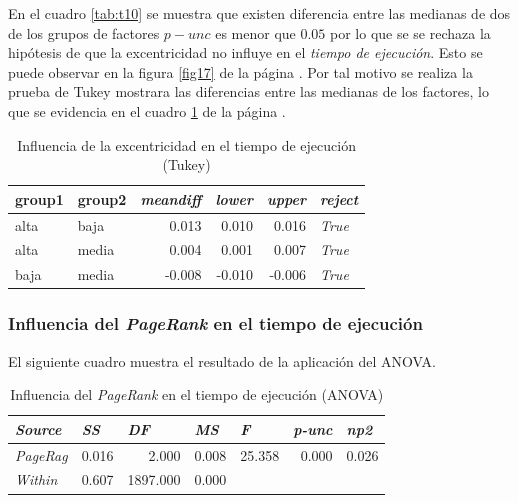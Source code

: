 \documentclass{article}
\begin{document}
En el cuadro \ref{tab:t10} se muestra que existen  diferencia entre las medianas de dos de los grupos de factores  \textbf{$p-unc$} es menor que $0.05$ por lo que se se rechaza la hipótesis de que la excentricidad no influye en el \textit{tiempo de ejecución}. Esto se puede observar en la figura \ref{fig17} de la página \pageref{fig17}. Por tal motivo se realiza la prueba de Tukey mostrara las diferencias entre las medianas de los factores, lo que se evidencia en el cuadro \ref{tab:t11} de la página \pageref{tab:t11}.

\begin{table}[htbp]
  \centering
  \caption{Influencia de la excentricidad en el tiempo de ejecución (Tukey)}
    \begin{tabular}{llrrrl}
    \toprule
    \textbf{group1} & \textbf{group2} & \multicolumn{1}{l}{\textit{\textbf{meandiff}}} & \multicolumn{1}{l}{\textit{\textbf{lower}}} & \multicolumn{1}{l}{\textit{\textbf{upper}}} & \textit{\textbf{reject}} \\
    \midrule
    alta  & baja  & 0.013 & 0.010 & 0.016 & \textit{True} \\
    alta  & media & 0.004 & 0.001 & 0.007 & \textit{True} \\
    baja  & media & -0.008 & -0.010 & -0.006 & \textit{True} \\
    \bottomrule
    \end{tabular}%
  \label{tab:t11}%
\end{table}%

\subsubsection{Influencia del \textit{PageRank} en el tiempo de ejecución}

El siguiente cuadro muestra el resultado de la aplicación del ANOVA.

\begin{table}[htbp]
  \centering
  \caption{Influencia del \textit{PageRank} en el tiempo de ejecución (ANOVA)}
    \begin{tabular}{lrrrrrr}
    \toprule
    \textit{\textbf{Source}} & \multicolumn{1}{l}{\textit{\textbf{SS}}} & \multicolumn{1}{l}{\textit{\textbf{DF}}} & \multicolumn{1}{l}{\textit{\textbf{MS}}} & \multicolumn{1}{l}{\textit{\textbf{F}}} & \multicolumn{1}{l}{\textit{\textbf{p-unc}}} & \multicolumn{1}{l}{\textit{\textbf{np2}}} \\
    \midrule
    \textit{PageRag} & 0.016 & 2.000 & 0.008 & 25.358 & 0.000 & 0.026 \\
    \textit{Within} & 0.607 & 1897.000 & 0.000 &       &       &  \\
    \bottomrule
    \end{tabular}%
  \label{tab:t12}%
\end{table}%
\end{document}
